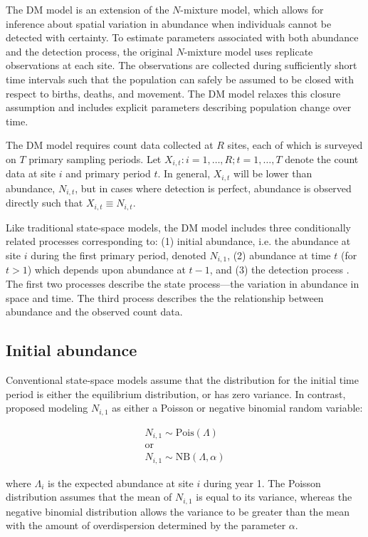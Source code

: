 \documentclass[12pt,english]{article}
\begin{document}
\begin{spacing}{1.9}
\begin{flushleft}
The DM model is an extension of the 
\citet{royle:2004biom} $N$-mixture model, which allows for inference about spatial
variation in abundance when individuals cannot be detected with
certainty. To estimate parameters associated with both abundance 
and the detection process, the original $N$-mixture model uses replicate
observations at each site. The observations are collected during sufficiently
short time intervals such that the population can safely be
assumed to be closed with respect to births, deaths, and movement. The DM
model relaxes this closure assumption and includes explicit parameters
describing population change over time.

The DM model requires count data collected at $R$ sites, each of
which is surveyed on $T$ primary sampling periods. 
Let $X_{i,t}: i=1,\hdots,R; t=1,\hdots,T$ denote the count data
at site $i$ and primary period $t$. 
In general, $X_{i,t}$ will be lower than abundance, 
$N_{i,t}$, but in cases where detection is perfect,
abundance is observed directly such that $X_{i,t} \equiv N_{i,t}$.

Like traditional state-space models, the DM model includes 
three conditionally related processes corresponding to: 
(1) initial abundance, i.e. the
abundance at site $i$ during the first primary period,
denoted $N_{i,1}$, (2) abundance at time $t$ (for $t>1$) which depends upon
abundance at $t-1$, and (3) the
detection process \citep{dail_madsen:2011}.
The first two processes describe the state process---the
variation in abundance in space and time. The third process 
describes the the relationship between
abundance and the observed count data.

\subsection*{Initial abundance}

Conventional state-space models assume that the
distribution for the initial time period 
is either the equilibrium
distribution, or has zero variance.
In contrast, \citet{dail_madsen:2011} proposed modeling $N_{i,1}$
as either a Poisson or negative binomial random variable:
\begin{linenomath*}
\begin{gather}
N_{i,1} \sim \mathrm{Pois}(\Lambda) \nonumber \\
\text{or} \nonumber \\
N_{i,1} \sim \mathrm{NB}(\Lambda, \alpha)
\label{eq:N1}
\end{gather}
\end{linenomath*}
where $\Lambda_i$ is the expected abundance at site $i$ during
year 1.
The Poisson distribution assumes that the mean of $N_{i,1}$ is
equal to its variance, whereas the negative binomial distribution allows the
variance to be greater than the mean with the amount of
overdispersion determined by the parameter $\alpha$.


\end{flushleft}
\end{spacing}
\end{document}
